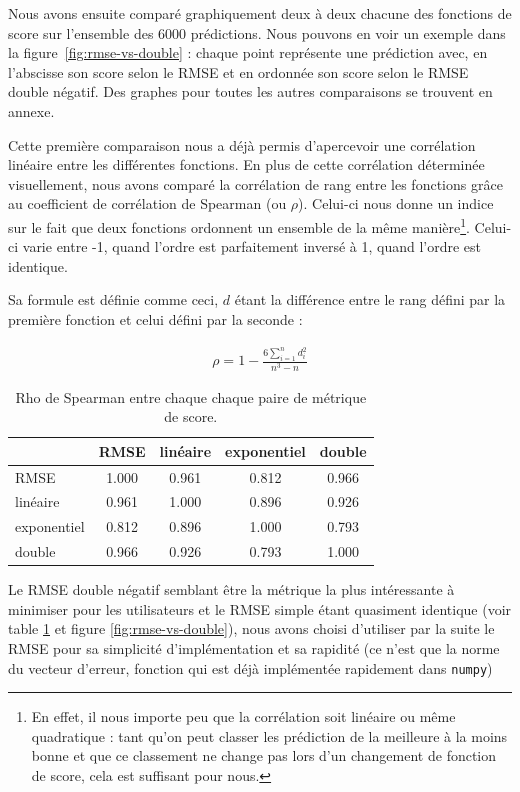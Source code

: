 \documentclass[letterpaper]{article}
\begin{document}
Nous avons ensuite comparé graphiquement deux à deux chacune des fonctions de score sur l'ensemble des 6000 prédictions. Nous pouvons en voir un exemple dans la figure~\ref{fig:rmse-vs-double} : chaque point représente une prédiction avec, en l’abscisse son score selon le RMSE et en ordonnée son score selon le RMSE double négatif. Des graphes pour toutes les autres comparaisons se trouvent en annexe.

Cette première comparaison nous a déjà permis d'apercevoir une corrélation linéaire entre les différentes fonctions.
En plus de cette corrélation déterminée visuellement, nous avons comparé la corrélation de rang entre les fonctions grâce au coefficient de corrélation de Spearman (ou $\rho$). Celui-ci nous donne un indice sur le fait que deux fonctions ordonnent un ensemble de la même manière\footnote{En effet, il nous importe peu que la corrélation soit linéaire ou même quadratique : tant qu'on peut classer les prédiction de la meilleure à la moins bonne et que ce classement ne change pas lors d'un changement de fonction de score, cela est suffisant pour nous.}. Celui-ci varie entre -1, quand l'ordre est parfaitement inversé à 1, quand l'ordre est identique.

Sa formule est définie comme ceci, $d$ étant la différence entre le rang défini par la première fonction et celui défini par la seconde :

\begin{eqnarray}
\rho = 1 - \frac{6 \sum_{i=1}^{n} d^2_i}{n^3 - n}
\end{eqnarray}

\begin{table}[h]
\begin{tabular}{|l|c|c|c|c|}
  \hline
  & RMSE & linéaire & exponentiel & double \\
  \hline
RMSE & 1.000 & 0.961 & 0.812 & 0.966 \\
linéaire & 0.961 & 1.000 & 0.896 & 0.926 \\
exponentiel & 0.812 & 0.896 & 1.000 & 0.793 \\
double & 0.966 & 0.926 & 0.793 & 1.000 \\
  \hline
\end{tabular}
  \caption{\label{tab:rho} Rho de Spearman entre chaque chaque paire de métrique de score.}
\end{table}

Le RMSE double négatif semblant être la métrique la plus intéressante à minimiser pour les utilisateurs et le RMSE simple étant quasiment identique (voir table \ref{tab:rho} et figure \ref{fig:rmse-vs-double}), nous avons choisi d'utiliser par la suite le RMSE pour sa simplicité d'implémentation et sa rapidité (ce n'est que la norme du vecteur d'erreur, fonction qui est déjà implémentée rapidement dans \texttt{numpy})
\end{document}
